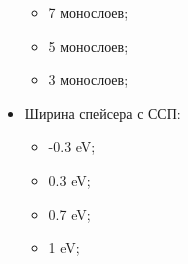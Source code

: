\documentclass[10pt,pdf,hyperref={unicode},aspectratio={169}]{beamer}
\begin{document}
\begin{frame}
\begin{columns}
\begin{itemize}
\begin{itemize}
			\item 7 монослоев;
			\item 5 монослоев;
			\item 3 монослоев;
		\end{itemize}
		\item Ширина спейсера с ССП: \begin{itemize}
			\footnotesize
			\item -0.3 eV;
			\item 0.3 eV;
			\item 0.7 eV;
			\item 1 eV;
		\end{itemize} 
	\end{itemize}
\end{columns}
\end{frame}
\end{document}
